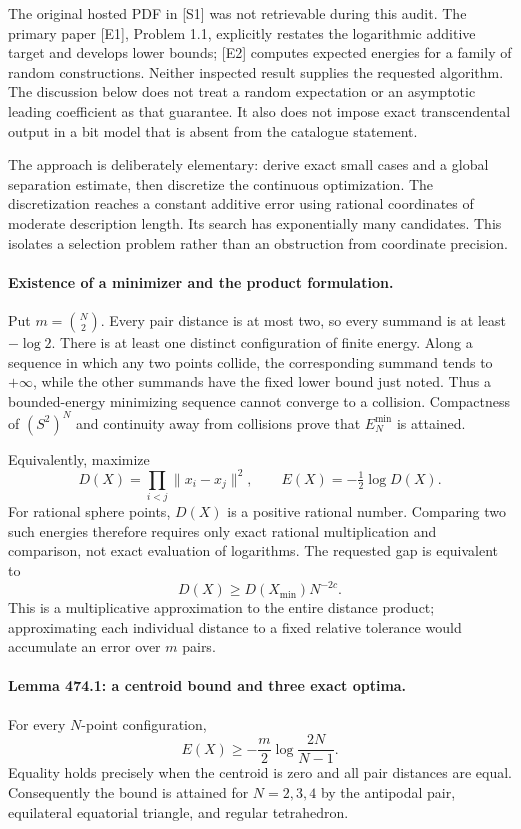 \documentclass[11pt]{article}
\begin{document}
The original hosted PDF in [S1] was not retrievable during this audit.
The primary paper [E1], Problem 1.1, explicitly restates the logarithmic
additive target and develops lower bounds; [E2] computes expected energies
for a family of random constructions. Neither inspected result supplies
the requested algorithm. The discussion below does not treat a random
expectation or an asymptotic leading coefficient as that guarantee. It
also does not impose exact transcendental output in a bit model that is
absent from the catalogue statement.

The approach is deliberately elementary: derive exact small cases and a
global separation estimate, then discretize the continuous optimization.
The discretization reaches a constant additive error using rational
coordinates of moderate description length. Its search has exponentially
many candidates. This isolates a selection problem rather than an
obstruction from coordinate precision.

\paragraph{Existence of a minimizer and the product formulation.}
Put $m=\binom N2$. Every pair distance is at most two, so every summand
is at least $-\log2$. There is at least one distinct configuration of
finite energy. Along a sequence in which any two points collide, the
corresponding summand tends to $+\infty$, while the other summands have
the fixed lower bound just noted. Thus a bounded-energy minimizing
sequence cannot converge to a collision. Compactness of $(S^2)^N$ and
continuity away from collisions prove that $E_N^{\min}$ is attained.

Equivalently, maximize
\begin{equation}\label{a474:product}
 D(X)=\prod_{i<j}\|x_i-x_j\|^2,\qquad E(X)=-\tfrac12\log D(X).
\end{equation}
For rational sphere points, $D(X)$ is a positive rational number.
Comparing two such energies therefore requires only exact rational
multiplication and comparison, not exact evaluation of logarithms.
The requested gap is equivalent to
\[
 D(X)\ge D(X_{\min})N^{-2c}.
\]
This is a multiplicative approximation to the entire distance product;
approximating each individual distance to a fixed relative tolerance
would accumulate an error over $m$ pairs.

\paragraph{Lemma 474.1: a centroid bound and three exact optima.}
For every $N$-point configuration,
\begin{equation}\label{a474:jensen}
 E(X)\ge-\frac m2\log\frac{2N}{N-1}.
\end{equation}
Equality holds precisely when the centroid is zero and all pair distances
are equal. Consequently the bound is attained for $N=2,3,4$ by the
antipodal pair, equilateral equatorial triangle, and regular tetrahedron.
\end{document}
